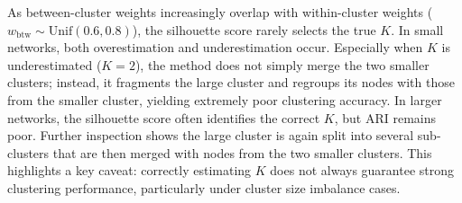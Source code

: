 \documentclass[12pt, titlepage, reqno]{article}
\begin{document}
As between-cluster weights increasingly overlap with within-cluster 
weights ($w_\text{btw} \sim \text{Unif}(0.6,0.8)$), the silhouette 
score rarely selects the true $K$. In small networks, both 
overestimation and underestimation occur. Especially when $K$ is 
underestimated ($K = 2$), the method does not simply merge the two 
smaller clusters; instead, it fragments the large cluster and 
regroups its nodes with those from the smaller cluster, yielding 
extremely poor clustering accuracy. In larger networks, the 
silhouette score often identifies the correct $K$, but ARI remains 
poor. Further inspection shows the large cluster is again split into 
several sub-clusters that are then merged with nodes from the two 
smaller clusters. This highlights a key caveat: correctly estimating 
$K$ does not always guarantee strong clustering performance, 
particularly under cluster size imbalance cases.
\end{document}

